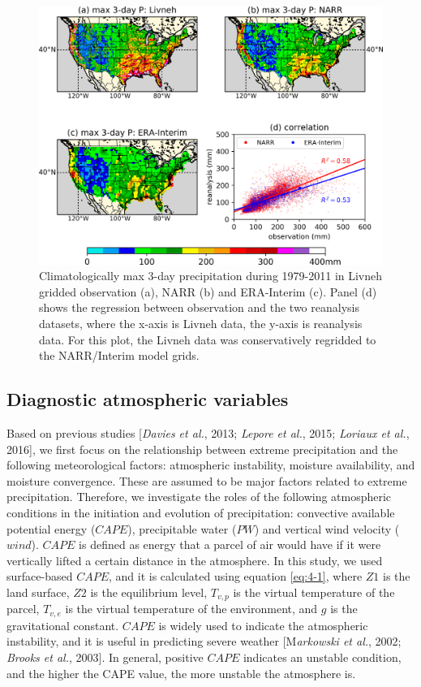 \begin{figure}[htbp]
	\includegraphics[width=\linewidth]{pics/ch4/fig1.png}
	\caption{Climatologically max 3-day precipitation during 1979-2011 in Livneh gridded observation (a), NARR (b) and ERA-Interim (c). Panel (d) shows the regression between observation and the two reanalysis datasets, where the x-axis is Livneh data, the y-axis is reanalysis data. For this plot, the Livneh data was conservatively regridded to the NARR/Interim model grids.}
	\label{fig:4-1}
\end{figure}

\subsection{Diagnostic atmospheric variables}

Based on previous studies [\textit{Davies et al.}, 2013; \textit{Lepore et al.}, 2015; \textit{Loriaux et al.}, 2016], we first focus on the relationship between extreme precipitation and the following meteorological factors: atmospheric instability, moisture availability, and moisture convergence. These are assumed to be major factors related to extreme precipitation. Therefore, we investigate the roles of the following atmospheric conditions in the initiation and evolution of precipitation: convective available potential energy ($CAPE$), precipitable water ($PW$) and vertical wind velocity ($wind$). $CAPE$ is defined as energy that a parcel of air would have if it were vertically lifted a certain distance in the atmosphere. In this study, we used surface-based $CAPE$, and it is calculated using equation \ref{eq:4-1}, where $Z1$ is the land surface, $Z2$ is the equilibrium level, $T_{v,p}$ is the virtual temperature of the parcel, $T_{v,e}$ is the virtual temperature of the environment, and $g$ is the gravitational constant. $CAPE$ is widely used to indicate the atmospheric instability, and it is useful in predicting severe weather [M\textit{arkowski et al.}, 2002; \textit{Brooks et al.}, 2003]. In general, positive $CAPE$ indicates an unstable condition, and the higher the CAPE value, the more unstable the atmosphere is.

